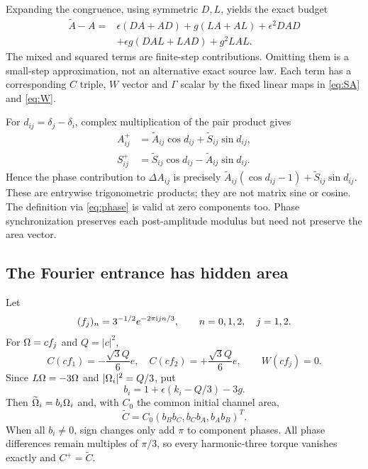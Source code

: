 \documentclass[11pt,a4paper]{article}
\begin{document}
Expanding the congruence, using symmetric $D,L$, yields the exact budget
\begin{align}
 \widetilde A-A={}&\epsilon(DA+AD)+g(LA+AL)+\epsilon^2DAD\nonumber\\
 &+\epsilon g(DAL+LAD)+g^2LAL.\label{eq:budget}
\end{align}
The mixed and squared terms are finite-step contributions. Omitting them is a small-step approximation, not an alternative exact source law. Each term has a corresponding $C$ triple, $W$ vector and $\Gamma$ scalar by the fixed linear maps in \eqref{eq:SA} and \eqref{eq:W}.

For $d_{ij}=\delta_j-\delta_i$, complex multiplication of the pair product gives
\begin{align}
 A_{ij}^+&=\widetilde A_{ij}\cos d_{ij}+\widetilde S_{ij}\sin d_{ij},\label{eq:rotateA}\\
 S_{ij}^+&=\widetilde S_{ij}\cos d_{ij}-\widetilde A_{ij}\sin d_{ij}.\label{eq:rotateS}
\end{align}
Hence the phase contribution to $\Delta A_{ij}$ is precisely
$\widetilde A_{ij}(\cos d_{ij}-1)+\widetilde S_{ij}\sin d_{ij}$. These are entrywise trigonometric products; they are not matrix sine or cosine. The definition via \eqref{eq:phase} is valid at zero components too. Phase synchronization preserves each post-amplitude modulus but need not preserve the area vector.

\subsection{The Fourier entrance has hidden area}
Let
\begin{equation}
 (f_j)_n=3^{-1/2}e^{-2\pi\mathrm i jn/3},\qquad n=0,1,2,\quad j=1,2.
\end{equation}
For $\Omega=cf_j$ and $Q=|c|^2$,
\begin{equation}
 C(cf_1)=-\frac{\sqrt3 Q}{6}e,\quad
 C(cf_2)=+\frac{\sqrt3 Q}{6}e,\qquad W(cf_j)=0.\label{eq:hidden}
\end{equation}
Since $L\Omega=-3\Omega$ and $|\Omega_i|^2=Q/3$, put
\begin{equation}
 b_i=1+\epsilon(k_i-Q/3)-3g.
\end{equation}
Then $\widetilde{\Omega}_i=b_i\Omega_i$ and, with $C_0$ the common initial channel area,
\begin{equation}
 \widetilde C=C_0(b_Bb_C,b_Cb_A,b_Ab_B)^T.\label{eq:entrance}
\end{equation}
When all $b_i\ne0$, sign changes only add $\pi$ to component phases. All phase differences remain multiples of $\pi/3$, so every harmonic-three torque vanishes exactly and $C^+=\widetilde C$.
\end{document}
